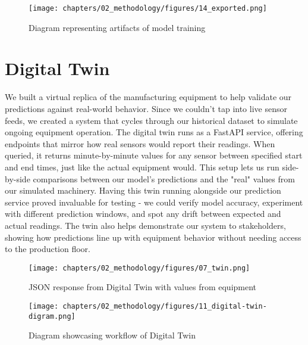 \begin{figure}[H]
    \centering
    \texttt{[image: chapters/02\_methodology/figures/14\_exported.png]}
    \caption{Diagram representing artifacts of model training}
    \label{fig:train-artifacts}
\end{figure}

\section{Digital Twin}
We built a virtual replica of the manufacturing equipment to help validate our predictions against real-world behavior. Since we couldn't tap into live sensor feeds, we created a system that cycles through our historical dataset to simulate ongoing equipment operation. The digital twin runs as a FastAPI service, offering endpoints that mirror how real sensors would report their readings. When queried, it returns minute-by-minute values for any sensor between specified start and end times, just like the actual equipment would. This setup lets us run side-by-side comparisons between our model's predictions and the "real" values from our simulated machinery. Having this twin running alongside our prediction service proved invaluable for testing - we could verify model accuracy, experiment with different prediction windows, and spot any drift between expected and actual readings. The twin also helps demonstrate our system to stakeholders, showing how predictions line up with equipment behavior without needing access to the production floor.

\begin{figure}[H]
    \centering
    \texttt{[image: chapters/02\_methodology/figures/07\_twin.png]}
    \caption{JSON response from Digital Twin with values from equipment}
\end{figure}

\begin{figure}
    \centering
    \texttt{[image: chapters/02\_methodology/figures/11\_digital-twin-digram.png]}
    \caption{Diagram showcasing workflow of Digital Twin}
    \label{fig:digital-twin-workflow}
\end{figure}

